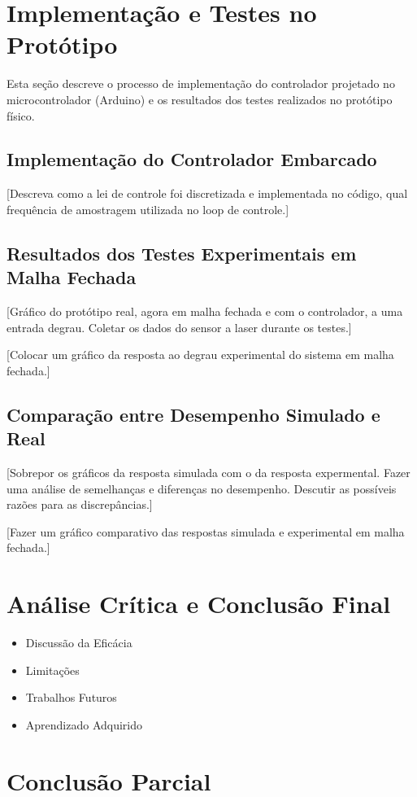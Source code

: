 \documentclass[9pt,a4paper,twocolumn,twoside]{tau-class/tau}
\begin{document}
\section{Implementação e Testes no Protótipo}
Esta seção descreve o processo de implementação do controlador projetado no microcontrolador (Arduino) e os resultados dos testes realizados no protótipo físico.

\subsection{Implementação do Controlador Embarcado}
[Descreva como a lei de controle foi discretizada e implementada no código, qual frequência de amostragem utilizada no loop de controle.]

\subsection{Resultados dos Testes Experimentais em Malha Fechada}
[Gráfico do protótipo real, agora em malha fechada e com o controlador, a uma entrada degrau. Coletar os dados do sensor a laser durante os testes.]

[Colocar um gráfico da resposta ao degrau experimental do sistema em malha fechada.]

\subsection{Comparação entre Desempenho Simulado e Real}
[Sobrepor os gráficos da resposta simulada com o da resposta expermental. Fazer uma análise de semelhanças e diferenças no desempenho. Descutir as possíveis razões para as discrepâncias.]

[Fazer um gráfico comparativo das respostas simulada e experimental em malha fechada.]

\section{Análise Crítica e Conclusão Final}

\begin{itemize}
    \item Discussão da Eficácia
    \item Limitações
    \item Trabalhos Futuros
    \item Aprendizado Adquirido
\end{itemize}

\section{Conclusão Parcial}
\end{document}

